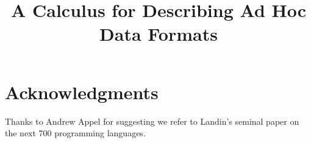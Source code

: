 \documentclass[nocopyrightspace]{sigplanconf}
\begin{document}
\title{A Calculus for Describing Ad Hoc Data Formats}
       {}

       {}
       {}



\maketitle{}

\begin{abstract}  

\end{abstract}
















%



\section*{Acknowledgments}

Thanks to Andrew Appel for
suggesting we refer to Landin's seminal paper on
the next 700 programming languages.





\end{document}
